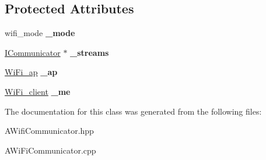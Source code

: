 \subsection*{Protected Attributes}
\begin{DoxyCompactItemize}
\item 
\mbox{\label{classwood_box_1_1communication_1_1_a_wi_fi_communicator_ac9195c5811ef0f4eebcfeecf9f0d1f9e}} 
wifi\+\_\+mode {\bfseries \+\_\+mode}
\item 
\mbox{\label{classwood_box_1_1communication_1_1_a_wi_fi_communicator_ac3ac6acb161746a89a8b9e12dd41461c}} 
\mbox{\hyperlink{classwood_box_1_1communication_1_1_i_communicator}{I\+Communicator}} $\ast$ {\bfseries \+\_\+streams}
\item 
\mbox{\label{classwood_box_1_1communication_1_1_a_wi_fi_communicator_aee3ecb9d4ba492654cc98df949419d14}} 
\mbox{\hyperlink{structs__wifi__access__point}{Wi\+Fi\+\_\+ap}} {\bfseries \+\_\+ap}
\item 
\mbox{\label{classwood_box_1_1communication_1_1_a_wi_fi_communicator_a9ea9ab9e7221b55843b196db9d82c324}} 
\mbox{\hyperlink{structs__wifi__client}{Wi\+Fi\+\_\+client}} {\bfseries \+\_\+me}
\end{DoxyCompactItemize}


The documentation for this class was generated from the following files\+:\begin{DoxyCompactItemize}
\item 
A\+Wifi\+Communicator.\+hpp\item 
A\+Wi\+Fi\+Communicator.\+cpp\end{DoxyCompactItemize}
